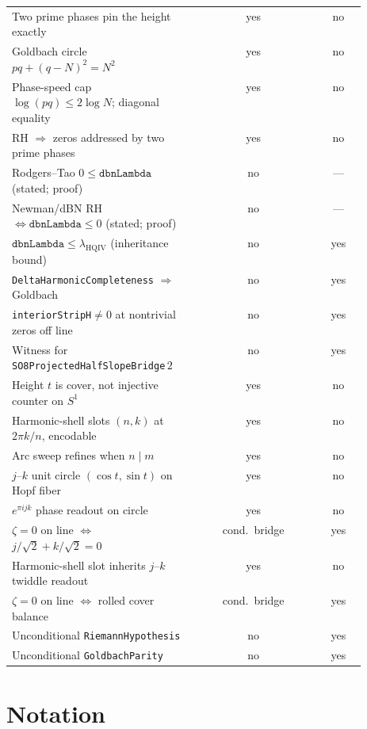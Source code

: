 \documentclass[11pt]{amsart}
\begin{document}
\begin{table}[h]
\begin{tabular}{@{}p{0.52\linewidth}cc@{}}
Two prime phases pin the height exactly & yes & no \\
Goldbach circle $pq+(q-N)^2=N^2$ & yes & no \\
Phase-speed cap $\log(pq)\le2\log N$; diagonal equality & yes & no \\
RH $\Rightarrow$ zeros addressed by two prime phases & yes & no \\
Rodgers--Tao $0\le\texttt{dbnLambda}$ (stated; proof) & no & --- \\
Newman/dBN RH $\Leftrightarrow\texttt{dbnLambda}\le0$ (stated; proof) & no & --- \\
$\texttt{dbnLambda}\le\lambda_{\mathrm{HQIV}}$ (inheritance bound) & no & yes \\
\texttt{DeltaHarmonicCompleteness} $\Rightarrow$ Goldbach & no & yes \\
\texttt{interiorStripH}$\neq0$ at nontrivial zeros off line & no & yes \\
Witness for \texttt{SO8ProjectedHalfSlopeBridge}\,$2$ & no & yes \\
Height $t$ is cover, not injective counter on $S^1$ & yes & no \\
Harmonic-shell slots $(n,k)$ at $2\pi k/n$, encodable & yes & no \\
Arc sweep refines when $n\mid m$ & yes & no \\
$j$--$k$ unit circle $(\cos t,\sin t)$ on Hopf fiber & yes & no \\
$e^{\pi i j k}$ phase readout on circle & yes & no \\
$\zeta=0$ on line $\Leftrightarrow$ $j/\sqrt2+k/\sqrt2=0$ & cond.\ bridge & yes \\
Harmonic-shell slot inherits $j$--$k$ twiddle readout & yes & no \\
$\zeta=0$ on line $\Leftrightarrow$ rolled cover balance & cond.\ bridge & yes \\
Unconditional \texttt{RiemannHypothesis} & no & yes \\
Unconditional \texttt{GoldbachParity} & no & yes \\
\bottomrule
\end{tabular}
\end{table}

\section{Notation}\label{app:notation}
\end{document}

